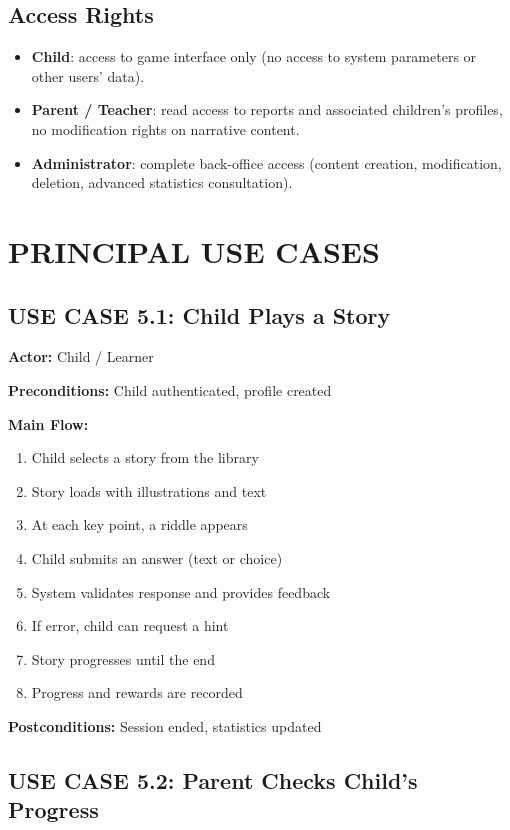 \documentclass[12pt,a4paper]{article}
\begin{document}
\subsection{Access Rights}

\begin{itemize}
    \item \textbf{Child}: access to game interface only (no access to system parameters or other users' data).
    \item \textbf{Parent / Teacher}: read access to reports and associated children's profiles, no modification rights on narrative content.
    \item \textbf{Administrator}: complete back-office access (content creation, modification, deletion, advanced statistics consultation).
\end{itemize}

\newpage

\section{PRINCIPAL USE CASES}

\subsection{USE CASE 5.1: Child Plays a Story}

\textbf{Actor:} Child / Learner

\textbf{Preconditions:} Child authenticated, profile created

\textbf{Main Flow:}
\begin{enumerate}
    \item Child selects a story from the library
    \item Story loads with illustrations and text
    \item At each key point, a riddle appears
    \item Child submits an answer (text or choice)
    \item System validates response and provides feedback
    \item If error, child can request a hint
    \item Story progresses until the end
    \item Progress and rewards are recorded
\end{enumerate}

\textbf{Postconditions:} Session ended, statistics updated

\subsection{USE CASE 5.2: Parent Checks Child's Progress}
\end{document}

